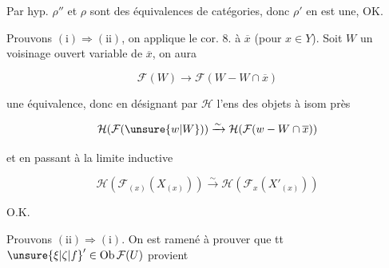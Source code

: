 

Par hyp. $\rho''$ et $\rho$ sont des équivalences de catégories, donc $\rho'$ en est une, OK.

Prouvons $(\mathrm{i})\Rightarrow(\mathrm{ii})$, on applique le cor. 8. à $\overline x$ (pour $x\in Y$). Soit $W$ un voisinage ouvert variable de $\overline x$, on aura

\[
\mathcal F(W)\longrightarrow\mathcal F(W-W\cap\overline x)
\]

une équivalence, donc  en désignant par $\mathcal H$ l'ens des objets à isom près

\[
\mathcal H(\mathcal F(\unsure{w|W}))\xrightarrow{\sim}\mathcal H(\mathcal F(w-W\cap\overline x))
\]

et en passant à la limite inductive

\[
\mathcal H(\mathcal F_{(x)}(X_{(x)}))\xrightarrow{\sim}
\mathcal H(\mathcal F_x(X'_{(x)}))
\]

O.K.

Prouvons $(\mathrm{ii})\Rightarrow(\mathrm{i})$. On est ramené à prouver que tt $\unsure{\xi|\zeta|f}'\in\mathrm{Ob}\,\mathcal F(U)$ provient

